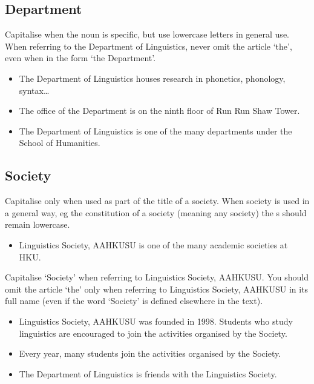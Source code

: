 \documentclass[11pt,a4paper]{book}
\newcommand{\cmark}{{\color{green(html/cssgreen)}\checkmark}}%
\begin{document}
			\subsection{Department}
			Capitalise when the noun is specific, but use lowercase letters in general use. When referring to the Department of Linguistics, never omit the article `the', even when in the form `the Department'.
				{\firasans \begin{mdframed}[backgroundcolor=aliceblue] \begin{itemize}[label=\cmark]
					\item The Department of Linguistics houses research in phonetics, phonology, syntax\ldots
					\item The office of the Department is on the ninth floor of Run Run Shaw Tower.
					\item The Department of Linguistics is one of the many departments under the School of Humanities.
				\end{itemize} \end{mdframed} }
			\subsection{Society}
			Capitalise only when used as part of the title of a society. When society is used in a general way, eg the constitution of a society (meaning any society) the s should remain lowercase.
				{\firasans \begin{mdframed}[backgroundcolor=aliceblue] \begin{itemize}[label=\cmark]
					\item Linguistics Society, AAHKUSU is one of the many academic societies at HKU.
				\end{itemize} \end{mdframed} }
			Capitalise `Society' when referring to Linguistics Society, AAHKUSU. You should omit the article `the' only when referring to Linguistics Society, AAHKUSU in its full name (even if the word `Society' is defined elsewhere in the text).
				{\firasans \begin{mdframed}[backgroundcolor=aliceblue] \begin{itemize}[label=\cmark]
					\item Linguistics Society, AAHKUSU was founded in 1998. Students who study linguistics are encouraged to join the activities organised by the Society.
					\item  Every year, many students join the activities organised by the Society.
					\item The Department of Linguistics is friends with the Linguistics Society.
				\end{itemize} \end{mdframed} }
\end{document}
